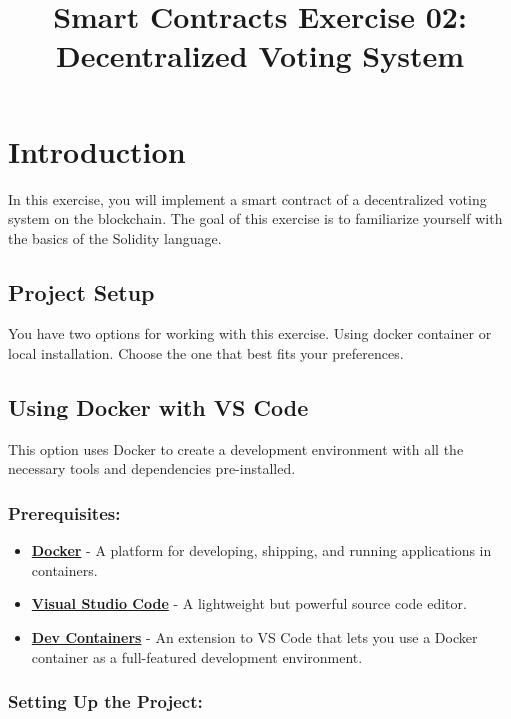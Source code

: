 \documentclass[12pt]{article}
\title{Smart Contracts Exercise 02: \\ Decentralized Voting System}
\author{}
\date{}
\begin{document}
\maketitle
\section{Introduction}

In this exercise, you will implement a smart contract of a decentralized voting system on the blockchain. The goal of this exercise is to familiarize yourself with the basics of the Solidity language.

\subsection*{Project Setup}

You have two options for working with this exercise. Using docker container or local installation. Choose the one that best fits your preferences.

\subsection{Using Docker with VS Code}

This option uses Docker to create a development environment with all the necessary tools and dependencies pre-installed.

\subsubsection*{Prerequisites:}

\begin{itemize}
    \item \textbf{\href{https://www.docker.com/products/docker-desktop}{Docker}} - A platform for developing, shipping, and running applications in containers.
    \item \textbf{\href{https://code.visualstudio.com/}{Visual Studio Code}} - A lightweight but powerful source code editor.
    \item \textbf{\href{https://marketplace.visualstudio.com/items?itemName=ms-vscode-remote.remote-containers}{Dev Containers}} - An extension to VS Code that lets you use a Docker container as a full-featured development environment.
\end{itemize}

\subsubsection*{Setting Up the Project:}
\end{document}
